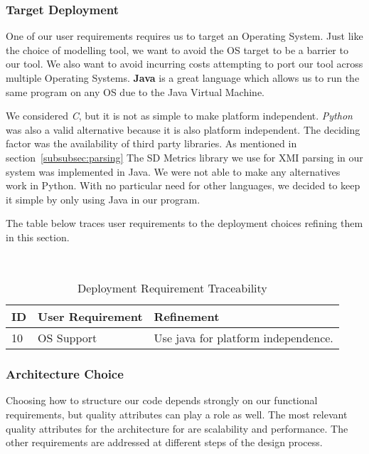 \documentclass[11pt]{article}
\begin{document}
    \newpage
    \subsubsection{Target Deployment}
    One of our user requirements requires us to target an Operating System.
    Just like the choice of modelling tool, we want to avoid the OS target to be a barrier to our tool.
    We also want to avoid incurring costs attempting to port our tool across multiple Operating Systems.
    \textbf{Java} is a great language which allows us to run the same program on any OS due to the Java Virtual Machine.

    We considered \textit{C}, but it is not as simple to make platform independent.
    \textit{Python} was also a valid alternative because it is also platform independent.
    The deciding factor was the availability of third party libraries.
    As mentioned in section~\ref{subsubsec:parsing} The SD Metrics library we use for XMI parsing in our system was implemented in Java.
    We were not able to make any alternatives work in Python.
    With no particular need for other languages, we decided to keep it simple by only using Java in our program.

    The table below traces user requirements to the deployment choices refining them in this section.
    \begin{table}[htbp]
        \centering
        \caption{Deployment Requirement Traceability}\label{tab:os-choice-table}\\
        \begin{tabularx}{\textwidth}{| l | l | X |}
            \hline
            \textbf{ID} & \textbf{User Requirement} & \textbf{Refinement} \\
            \hline
            10 & OS Support & Use java for platform independence. \\ \hline
        \end{tabularx}
    \end{table}

    \newpage
    \subsubsection{Architecture Choice}
    Choosing how to structure our code depends strongly on our functional requirements,
    but quality attributes can play a role as well.
    The most relevant quality attributes for the architecture for are scalability and performance.
    The other requirements are addressed at different steps of the design process.
\end{document}
